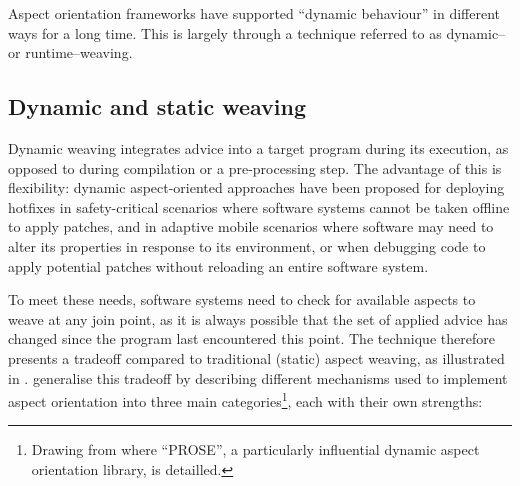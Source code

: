 
Aspect orientation frameworks have supported ``dynamic behaviour'' in different
ways for a long time. This is largely through a technique referred to as dynamic–
or runtime–weaving.

\subsection{Dynamic and static weaving}

Dynamic weaving integrates advice into a target program during its execution, as
opposed to during compilation or a pre-processing step. The advantage of this is
flexibility: dynamic aspect-oriented approaches have been proposed for deploying
hotfixes in safety-critical scenarios where software systems cannot be taken
offline to apply patches, and in adaptive mobile scenarios where software
may need to alter its properties in response to its
environment\cite{hveding2005aspect}, or when debugging code to apply potential
patches without reloading an entire software system\cite{popovici2002PROSE}.

To meet these needs, software systems need to check for available aspects to
weave at any join point, as it is always possible that the set of applied advice
has changed since the program last encountered this point. The technique
therefore presents a tradeoff compared to traditional (static) aspect weaving,
as illustrated in \cite{dynamicAOchitchyan}. \citeauthor{dynamicAOchitchyan}
generalise this tradeoff by describing different mechanisms used to implement
aspect orientation into three main categories\footnote{Drawing from
\cite{popovici2002PROSE,popovici2003JITaspects} where ``PROSE'', a particularly
influential dynamic aspect orientation library, is detailled.}, each with their own
strengths:

